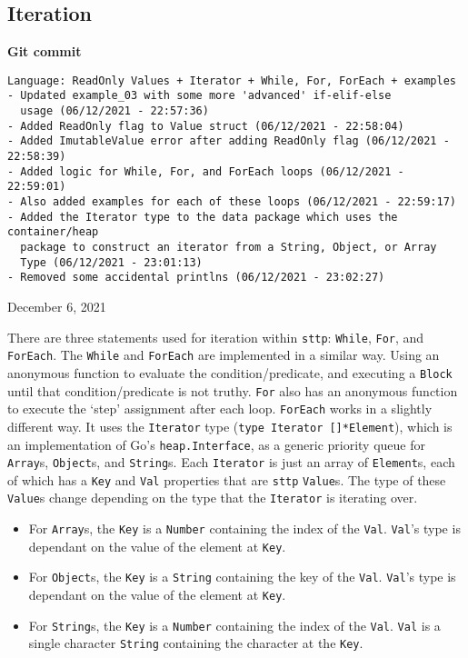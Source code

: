 \subsection{Iteration}

\begin{center}
    \textbf{Git commit}
    \begin{verbatim}
Language: ReadOnly Values + Iterator + While, For, ForEach + examples
- Updated example_03 with some more 'advanced' if-elif-else 
  usage (06/12/2021 - 22:57:36)
- Added ReadOnly flag to Value struct (06/12/2021 - 22:58:04)
- Added ImutableValue error after adding ReadOnly flag (06/12/2021 - 22:58:39)
- Added logic for While, For, and ForEach loops (06/12/2021 - 22:59:01)
- Also added examples for each of these loops (06/12/2021 - 22:59:17)
- Added the Iterator type to the data package which uses the container/heap
  package to construct an iterator from a String, Object, or Array
  Type (06/12/2021 - 23:01:13)
- Removed some accidental printlns (06/12/2021 - 23:02:27)
    \end{verbatim}
    \vspace{-1em}
    \tiny{December 6, 2021}
\end{center}

There are three statements used for iteration within \verb|sttp|: \verb|While|, \verb|For|, and \verb|ForEach|. The \verb|While| and \verb|ForEach| are implemented in a similar way. Using an anonymous function to evaluate the condition/predicate, and executing a \verb|Block| until that condition/predicate is not truthy. \verb|For| also has an anonymous function to execute the `step' assignment after each loop. \verb|ForEach| works in a slightly different way. It uses the \verb|Iterator| type (\texttt{type Iterator []*Element}), which is an implementation of Go's \verb|heap.Interface|, as a generic priority queue for \verb|Array|s, \verb|Object|s, and \verb|String|s. Each \verb|Iterator| is just an array of \verb|Element|s, each of which has a \verb|Key| and \verb|Val| properties that are \verb|sttp| \verb|Value|s. The type of these \verb|Value|s change depending on the type that the \verb|Iterator| is iterating over.

\begin{itemize}
    \item For \verb|Array|s, the \verb|Key| is a \verb|Number| containing the index of the \verb|Val|. \verb|Val|'s type is dependant on the value of the element at \verb|Key|.
    \item For \verb|Object|s, the \verb|Key| is a \verb|String| containing the key of the \verb|Val|. \verb|Val|'s type is dependant on the value of the element at \verb|Key|.
    \item For \verb|String|s, the \verb|Key| is a \verb|Number| containing the index of the \verb|Val|. \verb|Val| is a single character \verb|String| containing the character at the \verb|Key|.
\end{itemize}

